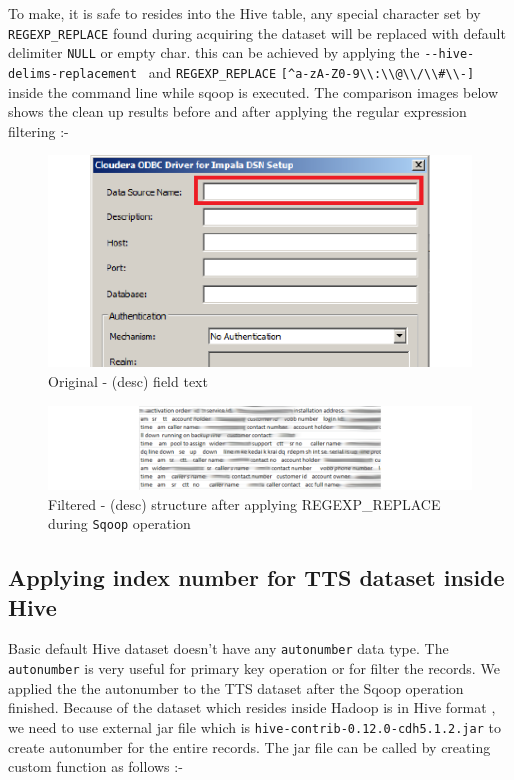 \documentclass[]{article}
\begin{document}
To make, it is safe to resides into the Hive table, any special
character set by \texttt{REGEXP\_REPLACE} found during acquiring the
dataset will be replaced with default delimiter \texttt{NULL} or empty
char. this can be achieved by applying the
\texttt{-\/-hive-delims-replacement\ \textquotesingle{}\textquotesingle{}}
and \texttt{REGEXP\_REPLACE}
\texttt{{[}\^{}a-zA-Z0-9\textbackslash{}\textbackslash{}:\textbackslash{}\textbackslash{}@\textbackslash{}\textbackslash{}/\textbackslash{}\textbackslash{}\#\textbackslash{}\textbackslash{}-{]}}
inside the command line while sqoop is executed. The comparison images
below shows the clean up results before and after applying the regular
expression filtering :-

\begin{figure}[htbp]
\centering
\includegraphics{Journal1_files/figure-latex/unnamed-chunk-8-1.pdf}
\caption{Original - (desc) field text}
\end{figure}

\begin{figure}[htbp]
\centering
\includegraphics{Journal1_files/figure-latex/unnamed-chunk-9-1.pdf}
\caption{Filtered - (desc) structure after applying REGEXP\_REPLACE
during \texttt{Sqoop} operation}
\end{figure}

\subsection{Applying index number for TTS dataset inside
Hive}\label{applying-index-number-for-tts-dataset-inside-hive}

Basic default Hive dataset doesn't have any \texttt{autonumber} data
type. The \texttt{autonumber} is very useful for primary key operation
or for filter the records. We applied the the autonumber to the TTS
dataset after the Sqoop operation finished. Because of the dataset which
resides inside Hadoop is in Hive format , we need to use external jar
file which is \texttt{hive-contrib-0.12.0-cdh5.1.2.jar} to create
autonumber for the entire records. The jar file can be called by
creating custom function as follows :-
\end{document}
